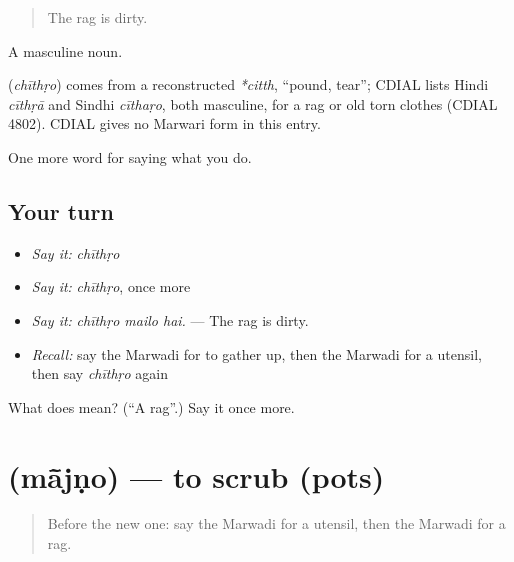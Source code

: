 \begin{quote}
The rag is dirty.
\end{quote}

A masculine noun.

\begin{cousinweb}
\textbf{} (\emph{chīthṛo}) comes from a reconstructed \emph{*citth}, \textquotedblleft{}pound, tear\textquotedblright{}; CDIAL lists Hindi \emph{cīthṛā} and Sindhi \emph{cīthaṛo}, both masculine, for a rag or old torn clothes (CDIAL 4802). CDIAL gives no Marwari form in this entry.
\end{cousinweb}

\begin{grammarlens}[title={What you've built}]
One more word for saying what you do.
\end{grammarlens}

\subsection*{Your turn}
\begin{itemize}
\raggedright
  \item \emph{Say it:} \emph{chīthṛo}
  \item \emph{Say it:} \emph{chīthṛo}, once more
  \item \emph{Say it:} \emph{chīthṛo mailo hai.} — The rag is dirty.
  \item \emph{Recall:} say the Marwadi for to gather up, then the Marwadi for a utensil, then say \emph{chīthṛo} again
\end{itemize}

\begin{tcolorbox}[breakable,colback=teal!4,colframe=teal!35!black,title={Before you move on}]
What does  mean? (\textquotedblleft{}A rag\textquotedblright{}.) Say it once more.
\end{tcolorbox}
\section[\texorpdfstring{\mw{मांजणो} (mā̃jṇo)}{मांजणो (mā̃jṇo)}]{ (mā̃jṇo) — to scrub (pots)}

\label{lesson:MW-C171-majno}



\begin{quote}
Before the new one: say the Marwadi for a utensil, then the Marwadi for a rag.
\end{quote}

